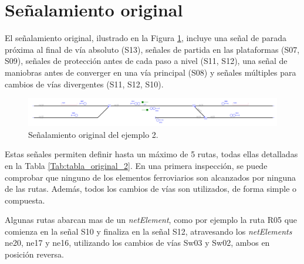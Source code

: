 \section{Señalamiento original}

    El señalamiento original, ilustrado en la Figura \ref{fig:EJ2_2}, incluye una señal de parada próxima al final de vía absoluto (S13), señales de partida en las plataformas (S07, S09), señales de protección antes de cada paso a nivel (S11, S12), una señal de maniobras antes de converger en una vía principal (S08) y señales múltiples para cambios de vías divergentes (S11, S12, S10).
    
    \begin{figure}[H]
    	\centering
    	\includegraphics[width=1\textwidth]{resultados-obtenidos/ejemplo2/images/2_original.png}
    	\centering\caption{Señalamiento original del ejemplo 2.}
    	\label{fig:EJ2_2}
    \end{figure}
    
    Estas señales permiten definir hasta un máximo de 5 rutas, todas ellas detalladas en la Tabla \ref{Tab:tabla_original_2}. En una primera inspección, se puede comprobar que ninguno de los elementos ferroviarios son alcanzados por ninguna de las rutas. Además, todos los cambios de vías son utilizados, de forma simple o compuesta. 
    
    \begin{table}[H]
        {
        \caption{Tabla de enclavamiento original del ejemplo 2.}
        \label{Tab:tabla_original_2}
        \centering
     }
    \end{table}
    
    Algunas rutas abarcan mas de un \textit{netElement}, como por ejemplo la ruta R05 que comienza en la señal S10 y finaliza en la señal S12, atravesando los \textit{netElements} ne20, ne17 y ne16, utilizando los cambios de vías Sw03 y Sw02, ambos en posición reversa.